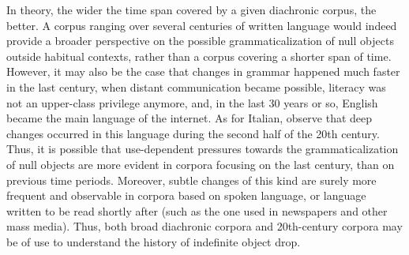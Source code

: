 In theory, the wider the time span covered by a given diachronic corpus, the better. A corpus ranging over several centuries of written language would indeed provide a broader perspective on the possible grammaticalization of null objects outside habitual contexts, rather than a corpus covering a shorter span of time. However, it may also be the case that changes in grammar happened much faster in the last century, when distant communication became possible, literacy was not an upper-class privilege anymore, and, in the last 30 years or so, English became the main language of the internet. As for Italian, \textcite{basile2020diachronic} observe that deep changes occurred in this language during the second half of the 20th century. Thus, it is possible that use-dependent pressures towards the grammaticalization of null objects are more evident in corpora focusing on the last century, than on previous time periods. Moreover, subtle changes of this kind are surely more frequent and observable in corpora based on spoken language, or language written to be read shortly after (such as the one used in newspapers and other mass media). Thus, both broad diachronic corpora and 20th-century corpora may be of use to understand the history of indefinite object drop.




